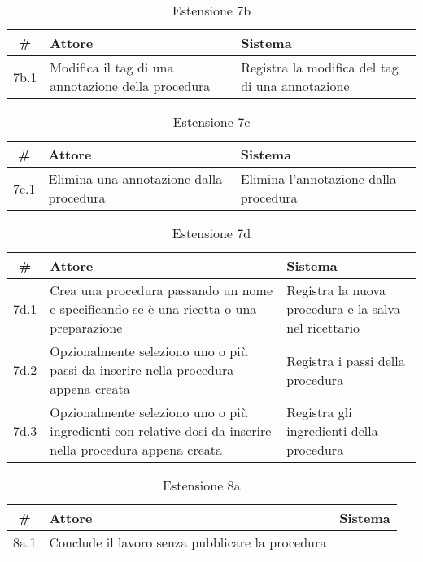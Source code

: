 \begin{table}[H]\centering\caption*{Estensione 7b}
      \small
      \begin{tabular}{|c|p{7cm}|p{6.24cm}|}
            \hline\bfseries \# & \bfseries Attore                                      & \bfseries Sistema                     \\\hline
            7b.1               & Modifica il tag di una annotazione della procedura & Registra la modifica del tag di una annotazione \\\hline
      \end{tabular}
\end{table}

\begin{table}[H]\centering\caption*{Estensione 7c}
      \small
      \begin{tabular}{|c|p{7cm}|p{6.24cm}|}
            \hline\bfseries \# & \bfseries Attore                                      & \bfseries Sistema                     \\\hline
            7c.1               & Elimina una annotazione dalla procedura & Elimina l’annotazione dalla procedura \\\hline
      \end{tabular}
\end{table}

\begin{table}[H]\centering\caption*{Estensione 7d}
      \small
      \begin{tabular}{|c|p{7cm}|p{6.24cm}|}
            \hline\bfseries \# & \bfseries Attore                                                                                          & \bfseries Sistema                                     \\\hline
            7d.1               & Crea una procedura passando un nome e specificando se è una ricetta o una preparazione      & Registra la nuova procedura e la salva nel ricettario \\\hline
            7d.2               & Opzionalmente seleziono uno o più passi da inserire nella procedura appena creata                         & Registra i passi della procedura                      \\\hline
            7d.3               & Opzionalmente seleziono uno o più ingredienti con relative dosi da inserire nella procedura appena creata & Registra gli ingredienti della procedura              \\\hline
      \end{tabular}
\end{table}

\begin{table}[H]\centering\caption*{Estensione 8a}
      \small
      \begin{tabular}{|c|p{7cm}|p{6.24cm}|}
            \hline\bfseries \# & \bfseries Attore                                 & \bfseries Sistema \\\hline
            8a.1               & Conclude il lavoro senza pubblicare la procedura &                   \\\hline
      \end{tabular}
\end{table}
\normalsize